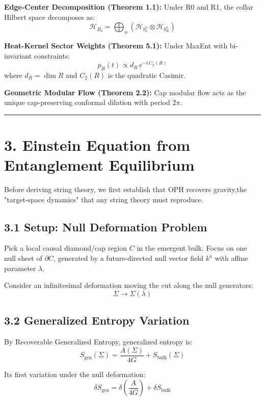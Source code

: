 \textbf{Edge-Center Decomposition (Theorem 1.1):} Under R0 and R1, the collar Hilbert space decomposes as: \[\mathcal{H}_{B_\delta} = \bigoplus_{\alpha} \left(\mathcal{H}_{b_L^\alpha} \otimes \mathcal{H}_{b_R^\alpha}\right)\]

\textbf{Heat-Kernel Sector Weights (Theorem 5.1):} Under MaxEnt with bi-invariant constraints: \[p_R(t) \propto d_R \, e^{-t \, C_2(R)}\] where \(d_R = \dim R\) and \(C_2(R)\) is the quadratic Casimir.

\textbf{Geometric Modular Flow (Theorem 2.2):} Cap modular flow acts as the unique cap-preserving conformal dilation with period \(2\pi\).

\begin{center}\rule{0.5\linewidth}{0.5pt}\end{center}

\section{3. Einstein Equation from Entanglement Equilibrium}\label{3-einstein-equation-from-entanglement-equilibrium}

Before deriving string theory, we first establish that OPH recovers gravity,the "target-space dynamics" that any string theory must reproduce.

\subsection{3.1 Setup: Null Deformation Problem}\label{31-setup-null-deformation-problem}

Pick a local causal diamond/cap region \(C\) in the emergent bulk. Focus on one null sheet of \(\partial C\), generated by a future-directed null vector field \(k^a\) with affine parameter \(\lambda\).

Consider an infinitesimal deformation moving the cut along the null generators: \[\Sigma \to \Sigma(\lambda)\]

\subsection{3.2 Generalized Entropy Variation}\label{32-generalized-entropy-variation}

By Recoverable Generalized Entropy, generalized entropy is: \[S_{\text{gen}}(\Sigma) = \frac{A(\Sigma)}{4G} + S_{\text{bulk}}(\Sigma)\]

Its first variation under the null deformation: \[\delta S_{\text{gen}} = \delta\left(\frac{A}{4G}\right) + \delta S_{\text{bulk}}\]

